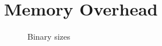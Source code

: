 \section{Memory Overhead}
\label{sec:pa_memory}

\lipsum[1]

\begin{figure}[htbp]
  \centering
  \def\stackalignment{r} %
  {\scriptsize }
  \caption{Binary sizes}
  \label{fig:binsize}
\end{figure}

